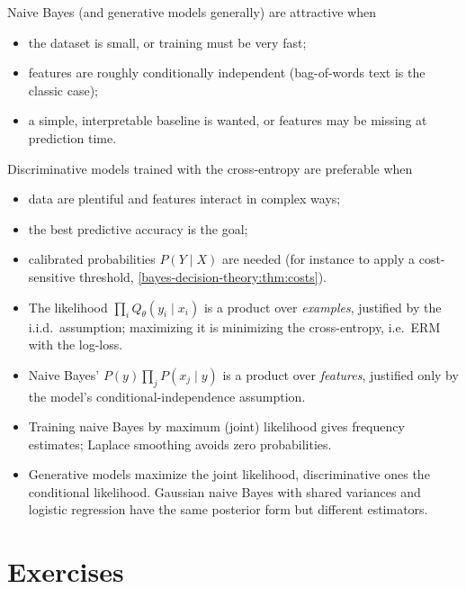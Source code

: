\begin{notechapter}
Naive Bayes (and generative models generally) are attractive when
\begin{itemize}[nosep]
  \item the dataset is small, or training must be very fast;
  \item features are roughly conditionally independent (bag-of-words text is
        the classic case);
  \item a simple, interpretable baseline is wanted, or features may be
        missing at prediction time.
\end{itemize}
Discriminative models trained with the cross-entropy are preferable when
\begin{itemize}[nosep]
  \item data are plentiful and features interact in complex ways;
  \item the best predictive accuracy is the goal;
  \item calibrated probabilities $P(Y\mid X)$ are needed (for instance to apply
        a cost-sensitive threshold, \cref{bayes-decision-theory:thm:costs}).
\end{itemize}

\begin{chaptersummary}
\begin{itemize}[nosep]
  \item The likelihood $\prod_iQ_\theta(y_i\mid x_i)$ is a product over
        \emph{examples}, justified by the i.i.d.\ assumption; maximizing it is
        minimizing the cross-entropy, i.e.\ ERM with the log-loss.
  \item Naive Bayes' $P(y)\prod_jP(x_j\mid y)$ is a product over
        \emph{features}, justified only by the model's conditional-independence
        assumption.
  \item Training naive Bayes by maximum (joint) likelihood gives frequency
        estimates; Laplace smoothing avoids zero probabilities.
  \item Generative models maximize the joint likelihood, discriminative ones
        the conditional likelihood. Gaussian naive Bayes with shared variances
        and logistic regression have the same posterior form but different
        estimators.
\end{itemize}
\end{chaptersummary}

\section*{Exercises}


\end{notechapter}
